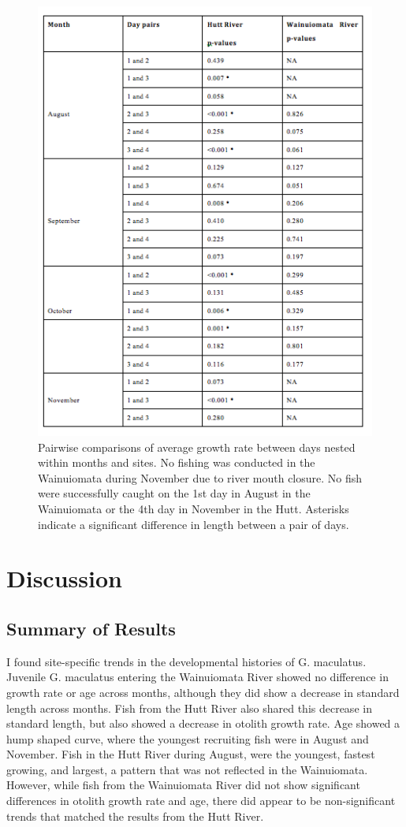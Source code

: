 \documentclass[]{book}
\begin{document}
\begin{figure}
\centering
\includegraphics{images/spatiotemp3table.png}
\caption{\label{fig:spatiotemp3table}Pairwise comparisons of average growth
rate between days nested within months and sites. No fishing was
conducted in the Wainuiomata during November due to river mouth closure.
No fish were successfully caught on the 1st day in August in the
Wainuiomata or the 4th day in November in the Hutt. Asterisks indicate a
significant difference in length between a pair of days.}
\end{figure}

\section{Discussion}\label{discussion}

\subsection{Summary of Results}\label{summary-of-results}

I found site-specific trends in the developmental histories of G.
maculatus. Juvenile G. maculatus entering the Wainuiomata River showed
no difference in growth rate or age across months, although they did
show a decrease in standard length across months. Fish from the Hutt
River also shared this decrease in standard length, but also showed a
decrease in otolith growth rate. Age showed a hump shaped curve, where
the youngest recruiting fish were in August and November. Fish in the
Hutt River during August, were the youngest, fastest growing, and
largest, a pattern that was not reflected in the Wainuiomata. However,
while fish from the Wainuiomata River did not show significant
differences in otolith growth rate and age, there did appear to be
non-significant trends that matched the results from the Hutt River.
\end{document}
